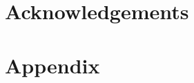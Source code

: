 \documentclass[times]{speauth}
\begin{document}

\section{Acknowledgements}




\newpage
\section{Appendix} \label{app:codelistings}
\end{document}
